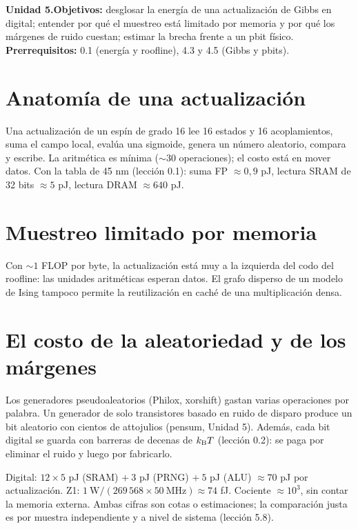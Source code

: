 \documentclass[11pt,a4paper]{article}
\begin{document}

\noindent\textbf{Unidad 5.}\quad\textbf{Objetivos:} desglosar la energía de una actualización de Gibbs en digital; entender por qué el muestreo está limitado
por memoria y por qué los márgenes de ruido cuestan; estimar la brecha frente a un pbit físico.
\textbf{Prerrequisitos:} 0.1 (energía y roofline), 4.3 y 4.5 (Gibbs y pbits).

\section{Anatomía de una actualización}
Una actualización de un espín de grado 16 lee 16 estados y 16 acoplamientos, suma el campo local, evalúa una sigmoide, genera un número aleatorio,
compara y escribe. La aritmética es mínima ($\sim30$ operaciones); el costo está en mover datos. Con la tabla de 45 nm (lección 0.1): suma FP
$\approx0{,}9$ pJ, lectura SRAM de 32 bits $\approx5$ pJ, lectura DRAM $\approx640$ pJ.

\section{Muestreo limitado por memoria}
Con $\sim1$ FLOP por byte, la actualización está muy a la izquierda del codo del roofline: las unidades aritméticas esperan datos. El grafo disperso
de un modelo de Ising tampoco permite la reutilización en caché de una multiplicación densa.

\section{El costo de la aleatoriedad y de los márgenes}
Los generadores pseudoaleatorios (Philox, xorshift) gastan varias operaciones por palabra. Un generador de solo transistores basado en ruido de disparo
produce un bit aleatorio con cientos de attojulios (pensum, Unidad 5). Además, cada bit digital se guarda con barreras de decenas de $k_{\mathrm B} T$
(lección 0.2): se paga por eliminar el ruido y luego por fabricarlo.

\begin{ejemplo}
Digital: $12\times5$ pJ (SRAM) $+\ 3$ pJ (PRNG) $+\ 5$ pJ (ALU) $\approx70$ pJ por actualización. Z1: $1\ \text{W}/(269\,568\times50\ \text{MHz})\approx74$ fJ.
Cociente $\approx10^3$, sin contar la memoria externa. Ambas cifras son cotas o estimaciones; la comparación justa es por muestra independiente y a nivel
de sistema (lección 5.8).
\end{ejemplo}
\end{document}
